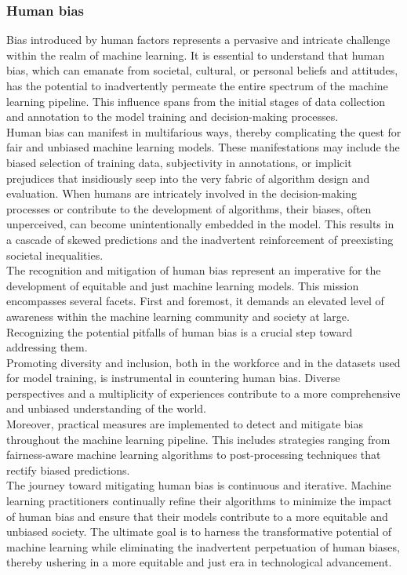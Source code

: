 \documentclass[12pt,a4paper,openright,twoside]{book}
\begin{document}
\subsubsection{Human bias}
Bias introduced by human factors represents a pervasive and intricate challenge within the realm of machine learning. It is essential to understand that human bias, which can emanate from societal, cultural, or personal beliefs and attitudes, has the potential to inadvertently permeate the entire spectrum of the machine learning pipeline. This influence spans from the initial stages of data collection and annotation to the model training and decision-making processes. \\
Human bias can manifest in multifarious ways, thereby complicating the quest for fair and unbiased machine learning models. These manifestations may include the biased selection of training data, subjectivity in annotations, or implicit prejudices that insidiously seep into the very fabric of algorithm design and evaluation. When humans are intricately involved in the decision-making processes or contribute to the development of algorithms, their biases, often unperceived, can become unintentionally embedded in the model. This results in a cascade of skewed predictions and the inadvertent reinforcement of preexisting societal inequalities. \cite{https://doi.org/10.1002/widm.1356} \\
The recognition and mitigation of human bias represent an imperative for the development of equitable and just machine learning models. This mission encompasses several facets. First and foremost, it demands an elevated level of awareness within the machine learning community and society at large. Recognizing the potential pitfalls of human bias is a crucial step toward addressing them. \\
Promoting diversity and inclusion, both in the workforce and in the datasets used for model training, is instrumental in countering human bias. Diverse perspectives and a multiplicity of experiences contribute to a more comprehensive and unbiased understanding of the world. \\
Moreover, practical measures are implemented to detect and mitigate bias throughout the machine learning pipeline. This includes strategies ranging from fairness-aware machine learning algorithms to post-processing techniques that rectify biased predictions. \\
The journey toward mitigating human bias is continuous and iterative. Machine learning practitioners continually refine their algorithms to minimize the impact of human bias and ensure that their models contribute to a more equitable and unbiased society. The ultimate goal is to harness the transformative potential of machine learning while eliminating the inadvertent perpetuation of human biases, thereby ushering in a more equitable and just era in technological advancement.
\end{document}
